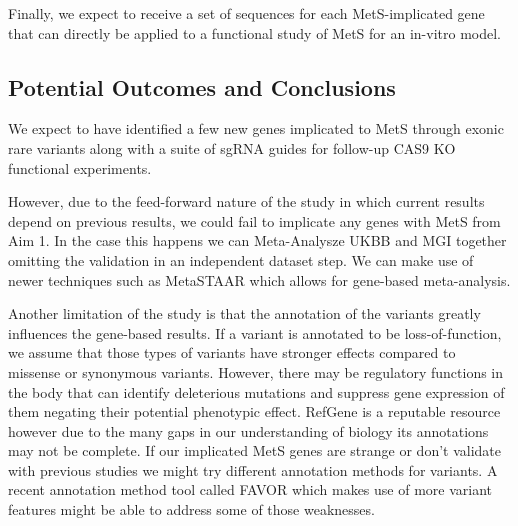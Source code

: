 \documentclass[11pt]{article}
\begin{document}
Finally, we expect to receive a set of sequences for each MetS-implicated gene that can directly be applied to a functional study of MetS for an in-vitro model.


\subsection*{Potential Outcomes and Conclusions}

We expect to have identified a few new genes implicated to MetS through exonic rare variants along with a suite of sgRNA guides for follow-up CAS9 KO functional experiments. 

However, due to the feed-forward nature of the study in which current results depend on previous results, we could fail to implicate any genes with MetS from Aim 1. In the case this happens we can Meta-Analysze UKBB and MGI together omitting the validation in an independent dataset step. We can make use of newer techniques such as MetaSTAAR which allows for gene-based meta-analysis.

Another limitation of the study is that the annotation of the variants greatly influences the gene-based results. If a variant is annotated to be loss-of-function, we assume that those types of variants have stronger effects compared to missense or synonymous variants. However, there may be regulatory functions in the body that can identify deleterious mutations and suppress gene expression of them negating their potential phenotypic effect. RefGene is a reputable resource however due to the many gaps in our understanding of biology its annotations may not be complete. If our implicated MetS genes are strange or don't validate with previous studies we might try different annotation methods for variants. A recent annotation method tool called FAVOR which makes use of more variant features might be able to address some of those weaknesses.


\newpage

 

\end{document}
